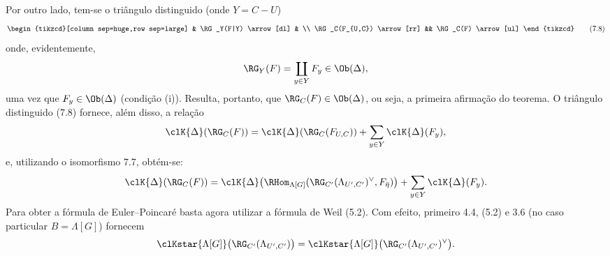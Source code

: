 Por outro lado, tem-se o triângulo distinguido (onde $Y=C-U$)
\[
\begin{tikzcd}[column sep=huge,row sep=large]
& \RG_Y(F|Y) \arrow[dl] & \\
\RG_C(F_{U,C}) \arrow[rr] && \RG_C(F) \arrow[ul]
\end{tikzcd}
\tag{7.8}
\]
onde, evidentemente,
\[
\RG_Y(F)=\coprod_{y\in Y}F_y\in\Ob(\Delta),
\]
uma vez que $F_y\in\Ob(\Delta)$ (condição (i)). Resulta, portanto, que $\RG_C(F)\in\Ob(\Delta)$, ou seja, a primeira afirmação do teorema. O triângulo distinguido (7.8) fornece, além disso, a relação
\[
\clK{\Delta}(\RG_C(F))
=
\clK{\Delta}(\RG_C(F_{U,C}))
+\sum_{y\in Y}\clK{\Delta}(F_y),
\]
e, utilizando o isomorfismo 7.7, obtém-se:
\[
\clK{\Delta}(\RG_C(F))
=
\clK{\Delta}\bigl(\RHom_{\Lambda[G]}(\RG_{C'}(\Lambda_{U',C'})^\vee,F_{\bar\eta})\bigr)
+\sum_{y\in Y}\clK{\Delta}(F_y).
\]
Para obter a fórmula de Euler--Poincaré basta agora utilizar a fórmula de Weil (5.2). Com efeito, primeiro 4.4, (5.2) e 3.6 (no caso particular $B=\Lambda[G]$) fornecem
\[
\clKstar{\Lambda[G]}\bigl(\RG_{C'}(\Lambda_{U',C'})\bigr)
=
\clKstar{\Lambda[G]}\bigl(\RG_{C'}(\Lambda_{U',C'})^\vee\bigr).
\]
